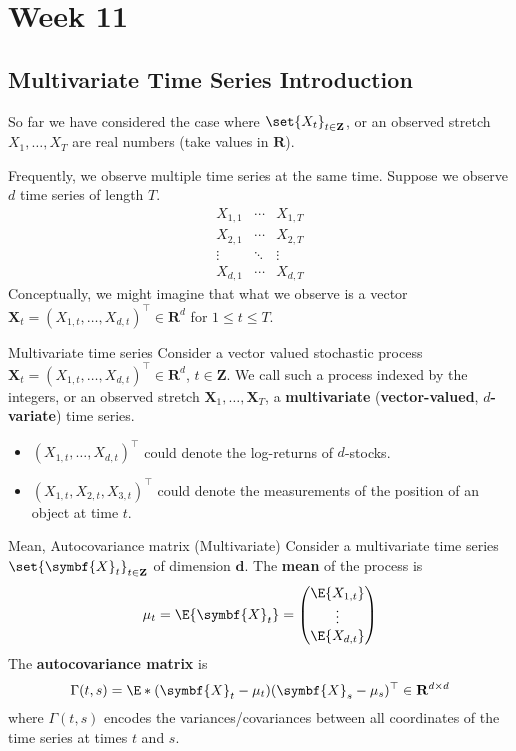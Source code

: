 \chapter{Week 11}
\section{Multivariate Time Series Introduction}
So far we have considered the case where
$ \set{X_t}_{t\in\mathbf{Z}} $,
or an observed stretch $ X_1,\ldots,X_T $
are real numbers (take values in $ \mathbf{R} $).

Frequently, we observe multiple time series at the same time.
Suppose we observe $ d $ time series of length $ T $.
\[ \begin{matrix}
        X_{1,1} & \cdots & X_{1,T} \\
        X_{2,1} & \cdots & X_{2,T} \\
        \vdots  & \ddots & \vdots  \\
        X_{d,1} & \cdots & X_{d,T}
    \end{matrix} \]
Conceptually, we might imagine that what we observe
is a vector $ \symbf{X}_t=(X_{1,t},\ldots,X_{d,t})^\top\in\mathbf{R}^d $
for $ 1\le t\le T $.
\begin{Definition}{Multivariate time series}{}
    Consider a vector valued stochastic process
    $ \symbf{X}_t=(X_{1,t},\ldots,X_{d,t})^\top\in\mathbf{R}^d $,
    $ t\in\mathbf{Z} $. We call such a process indexed
    by the integers, or an observed stretch
    $ \symbf{X}_1,\ldots,\symbf{X}_{T} $,
    a \textbf{multivariate} (\textbf{vector-valued}, \textbf{$d$-variate}) time series.
\end{Definition}
\begin{Example}{}{}
    \begin{itemize}
        \item $ (X_{1,t},\ldots,X_{d,t})^\top $ could denote the log-returns of $ d $-stocks.
        \item $ (X_{1,t},X_{2,t},X_{3,t})^\top $ could denote the measurements of the position
              of an object at time $ t $.
    \end{itemize}
\end{Example}
\begin{Definition}{Mean, Autocovariance matrix (Multivariate)}{}
    Consider a multivariate time series $ \set{\symbf{X}_t}_{t\in\mathbf{Z}} $
    of dimension $ \symbf{d} $. The \textbf{mean} of the process is
    \[ \mu_t=\E{\symbf{X}_t}=\begin{pmatrix}
            \E{X_{1,t}} \\
            \vdots      \\
            \E{X_{d,t}}
        \end{pmatrix} \]
    The \textbf{autocovariance matrix} is
    \[ \Gamma(t,s)=\E*{(\symbf{X}_t-\mu_t)(\symbf{X}_s-\mu_s)^\top}\in\mathbf{R}^{d\times d} \]
    where $ \Gamma(t,s) $ encodes the variances/covariances between all coordinates
    of the time series at times $ t $ and $ s $.
\end{Definition}
